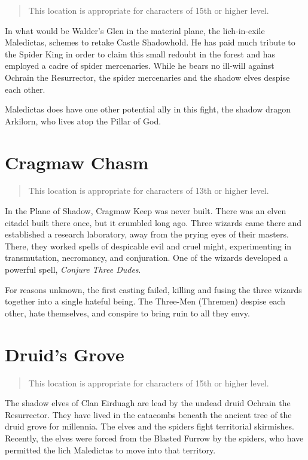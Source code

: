 \begin{quote}
  This location is appropriate for characters of 15th or higher level.
\end{quote}

In what would be Walder's Glen in the material plane, the lich-in-exile Maledictas,
schemes to retake Castle Shadowhold. He has paid much tribute to the Spider King
in order to claim this small redoubt in the forest and has employed a cadre of spider
mercenaries. While he bears no ill-will against Ochrain the Resurrector, the spider
mercenaries and the shadow elves despise each other.

Maledictas does have one other potential ally in this fight, the shadow dragon
Arkilorn, who lives atop the Pillar of God.


\section{Cragmaw Chasm} \label{loc:cragmawchasm}

\begin{quote}
  This location is appropriate for characters of 13th or higher level.
\end{quote}

In the Plane of Shadow, Cragmaw Keep was never built. There was an elven citadel
built there once, but it crumbled long ago. Three wizards came there and established
a research laboratory, away from the prying eyes of their masters. There, they worked
spells of despicable evil and cruel might, experimenting in transmutation, necromancy,
and conjuration. One of the wizards developed a powerful spell, \textit{Conjure Three Dudes}.

For reasons unknown, the first casting failed, killing and fusing the three wizards
together into a single hateful being. The Three-Men (Thremen) despise each other,
hate themselves, and conspire to bring ruin to all they envy.

\section{Druid's Grove} \label{loc:druidsgrove}

\begin{quote}
  This location is appropriate for characters of 15th or higher level.
\end{quote}

The shadow elves of Clan Eirduagh are lead by the undead druid Ochrain the Resurrector.
They have lived in the catacombs beneath the ancient tree of the druid grove for
millennia. The elves and the spiders fight territorial skirmishes. Recently, the elves
were forced from the Blasted Furrow by the spiders, who have permitted the lich Maledictas
to move into that territory.

